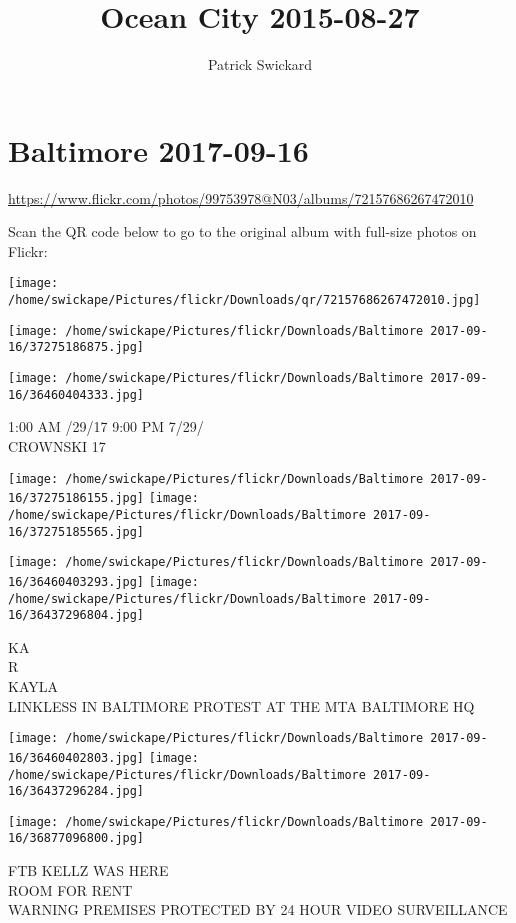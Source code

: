 \documentclass[10pt,letterpaper]{article}
\title{Ocean City 2015-08-27}
\author{Patrick Swickard}
\date{}
\begin{document}
\section*{Baltimore 2017-09-16}

\url{https://www.flickr.com/photos/99753978@N03/albums/72157686267472010}

Scan the QR code below to go to the original album with full-size photos on Flickr:

\texttt{[image: /home/swickape/Pictures/flickr/Downloads/qr/72157686267472010.jpg]}
\pagebreak

\texttt{[image: /home/swickape/Pictures/flickr/Downloads/Baltimore 2017-09-16/37275186875.jpg]}

\vspace{0.25in}
\texttt{[image: /home/swickape/Pictures/flickr/Downloads/Baltimore 2017-09-16/36460404333.jpg]}

1:00 AM /29/17 9:00 PM 7/29/\\
CROWNSKI 17
\pagebreak

\texttt{[image: /home/swickape/Pictures/flickr/Downloads/Baltimore 2017-09-16/37275186155.jpg]}
\texttt{[image: /home/swickape/Pictures/flickr/Downloads/Baltimore 2017-09-16/37275185565.jpg]}

\texttt{[image: /home/swickape/Pictures/flickr/Downloads/Baltimore 2017-09-16/36460403293.jpg]}
\texttt{[image: /home/swickape/Pictures/flickr/Downloads/Baltimore 2017-09-16/36437296804.jpg]}

KA\\
R\\
KAYLA\\
LINKLESS IN BALTIMORE PROTEST AT THE MTA BALTIMORE HQ
\pagebreak

\texttt{[image: /home/swickape/Pictures/flickr/Downloads/Baltimore 2017-09-16/36460402803.jpg]}
\texttt{[image: /home/swickape/Pictures/flickr/Downloads/Baltimore 2017-09-16/36437296284.jpg]}

\vspace{0.25in}
\texttt{[image: /home/swickape/Pictures/flickr/Downloads/Baltimore 2017-09-16/36877096800.jpg]}

FTB KELLZ WAS HERE\\
ROOM FOR RENT\\
WARNING PREMISES PROTECTED BY 24 HOUR VIDEO SURVEILLANCE
\pagebreak
\end{document}
